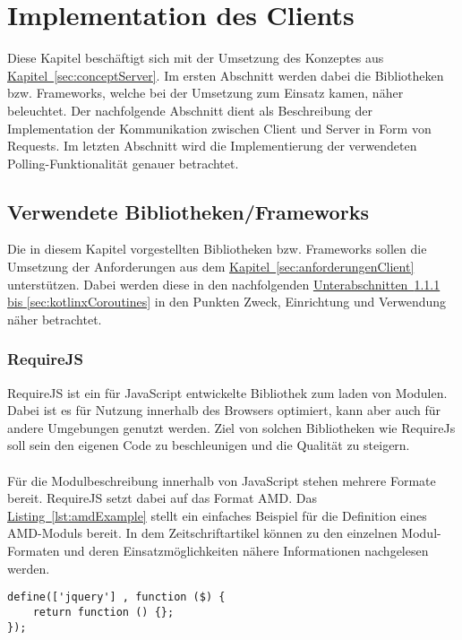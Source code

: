 
\chapter{Implementation des Clients}
Diese Kapitel beschäftigt sich mit der Umsetzung des Konzeptes aus \hyperref[sec:conceptServer]{Kapitel~\ref{sec:conceptServer}}. Im ersten Abschnitt werden dabei die Bibliotheken bzw. Frameworks, welche bei der Umsetzung zum Einsatz kamen, näher beleuchtet. Der nachfolgende Abschnitt dient als Beschreibung der Implementation der Kommunikation zwischen Client und Server in Form von Requests. Im letzten Abschnitt wird die Implementierung der verwendeten Polling-Funktionalität genauer betrachtet.

\section{Verwendete Bibliotheken/Frameworks}
Die in diesem Kapitel vorgestellten Bibliotheken bzw. Frameworks sollen die Umsetzung der Anforderungen aus dem \hyperref[sec:anforderungenClient]{Kapitel~\ref{sec:anforderungenClient}} unterstützen. Dabei werden diese in den nachfolgenden \hyperref[sec:requireJs, sec:kotlinxCoroutines]{Unterabschnitten~\ref{sec:requireJs} bis \ref{sec:kotlinxCoroutines}} in den Punkten Zweck, Einrichtung und Verwendung näher betrachtet.

\subsection{RequireJS}\label{sec:requireJs}
RequireJS ist ein für JavaScript entwickelte Bibliothek zum laden von Modulen. Dabei ist es für Nutzung innerhalb des Browsers optimiert, kann aber auch für andere Umgebungen genutzt werden. Ziel von solchen Bibliotheken wie RequireJs soll sein den eigenen Code zu beschleunigen und die Qualität zu steigern.\cite{requirejs}\\
\\
Für die Modulbeschreibung innerhalb von JavaScript stehen mehrere Formate bereit. RequireJS setzt dabei auf das Format \gls{AMD}. Das \hyperref[lst:amdExample]{Listing~\ref{lst:amdExample}} stellt ein einfaches Beispiel für die Definition eines \gls{AMD}-Moduls bereit. In dem Zeitschriftartikel \cite{jsModuleDefinitions} können zu den einzelnen Modul-Formaten und deren Einsatzmöglichkeiten nähere Informationen nachgelesen werden.
\begin{lstlisting}[style=lstStyleFramed, caption={Beispiel: Moduldefinition mittels \acrfull{AMD} \cite{requirejsExample}}, label=lst:amdExample]
define(['jquery'] , function ($) {
	return function () {};
});
\end{lstlisting}

